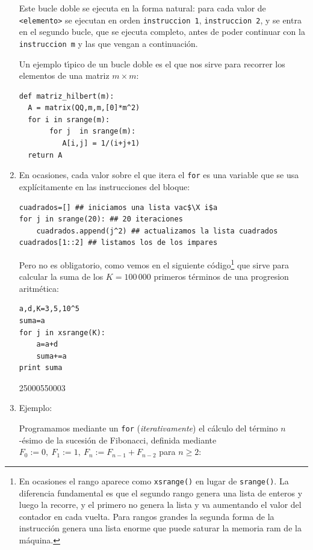 \begin{enumerate}
Este bucle doble se ejecuta en la forma natural: para cada valor de
\lstinline|<elemento>| se ejecutan en orden \lstinline|instruccion 1|, 
\lstinline|instruccion 2|, y se entra en el segundo bucle, que se ejecuta
completo, antes de poder continuar con la \lstinline|instruccion m| y las que
vengan a continuaci\'on.

Un ejemplo t\'{\i}pico de un bucle doble es el que nos sirve para recorrer los
elementos de una matriz $m\times m$:
\begin{lstlisting}
def matriz_hilbert(m):
  A = matrix(QQ,m,m,[0]*m^2)
  for i in srange(m):
       for j  in srange(m):
	      A[i,j] = 1/(i+j+1)
  return A	      
\end{lstlisting}

\item En ocasiones, cada valor sobre el que itera el \lstinline|for| es una
variable 
que se usa explícitamente en las instrucciones del bloque:
\begin{lstlisting}
cuadrados=[] ## iniciamos una lista vac$\X i$a
for j in srange(20): ## 20 iteraciones
	cuadrados.append(j^2) ## actualizamos la lista cuadrados
cuadrados[1::2] ## listamos los de los impares
\end{lstlisting}
\begin{Output}
	[1, 9, 25, 49, 81, 121, 169, 225, 289, 361]
\end{Output}
Pero no es obligatorio, como vemos en el siguiente código\footnote{En ocasiones 
el rango aparece como \lstinline|xsrange()| en lugar de \lstinline|srange()|. La
diferencia fundamental es que el segundo rango genera una lista de enteros y
luego la
recorre,  y el primero no genera la lista y va aumentando el valor del contador
en cada vuelta. Para rangos grandes la segunda forma de la instrucción genera
una lista enorme que puede saturar la memoria {\sc ram} de la máquina.} que
sirve para
calcular la suma de los $K=100\,000$ primeros términos de una progresion
aritmética:
\begin{lstlisting}
a,d,K=3,5,10^5
suma=a
for j in xsrange(K):
    a=a+d
    suma+=a 
print suma
\end{lstlisting}
\begin{Output}
	25000550003
\end{Output}


 \item {\sc Ejemplo:}

Programamos mediante un \lstinline|for| ({\itshape iterativamente}) el cálculo
del
término $n$-ésimo de la sucesión de Fibonacci, definida mediante $F_0:=0,\
F_1:=1,\ F_n:=F_{n-1}+F_{n-2}$ para $n\ge 2:$


\end{enumerate}
